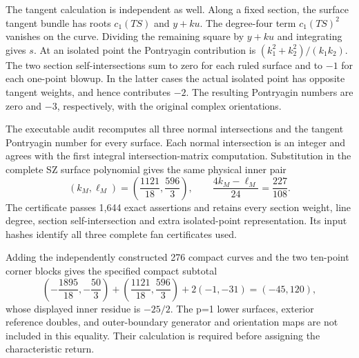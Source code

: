 The tangent calculation is independent as well. Along a fixed
section, the surface tangent bundle has roots \(c_1(TS)\) and
\(y+ku\). The degree-four term \(c_1(TS)^2\) vanishes on the
curve. Dividing the remaining square by \(y+ku\) and integrating
gives \(s\). At an isolated point the Pontryagin contribution is
\((k_1^2+k_2^2)/(k_1k_2)\). The two section self-intersections
sum to zero for each ruled surface and to \(-1\) for each
one-point blowup. In the latter cases the actual isolated point has
opposite tangent weights, and hence contributes \(-2\). The
resulting Pontryagin numbers are zero and \(-3\), respectively,
with the original complex orientations.

The executable audit recomputes all three normal intersections and
the tangent Pontryagin number for every surface. Each normal
intersection is an integer and agrees with the first integral
intersection-matrix computation. Substitution in the complete SZ
surface polynomial gives the same physical inner pair
\[
 (k_M,\ell_M)=\left(\frac{1121}{18},\frac{596}{3}\right),
 \qquad \frac{4k_M-\ell_M}{24}=\frac{227}{108}.
\]
The certificate passes 1,644 exact assertions and retains every
section weight, line degree, section self-intersection and extra
isolated-point representation. Its input hashes identify all three
complete fan certificates used.

Adding the independently constructed 276 compact curves and the
two ten-point corner blocks gives the specified compact subtotal
\[
 \left(-\frac{1895}{18},-\frac{50}{3}\right)
 +\left(\frac{1121}{18},\frac{596}{3}\right)
 +2(-1,-31)=(-45,120),
\]
whose displayed inner residue is \(-25/2\). The p=1 lower
surfaces, exterior reference doubles, and outer-boundary generator
and orientation maps are not included in this equality. Their
calculation is required before assigning the characteristic return.

